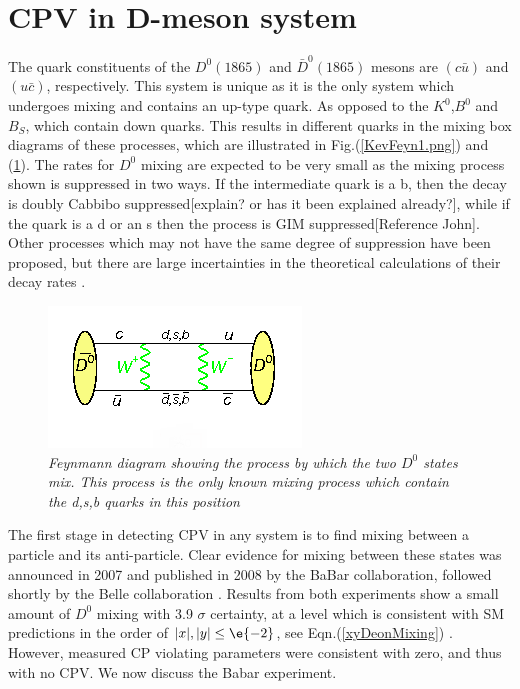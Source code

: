 \section{CPV in D-meson system}

The quark constituents of the $D^{0}(1865)$ and $\bar{D}^{0}(1865)$ mesons are $(c \bar{u})$ and $(u \bar{c})$, respectively. This system is unique as it is the only system which undergoes mixing and contains an up-type quark. As opposed to the $K^{0}$,$B^{0}$ and $B_{S}$, which contain down quarks. This results in different quarks in the mixing box diagrams of these processes, which are illustrated in Fig.(\ref{KevFeyn1.png}) and (\ref{Deon_Mixing_Feyn}). The rates for $D^0$ mixing are expected to be very small as the mixing process shown is suppressed in two ways. If the intermediate quark is a b, then the decay is doubly Cabbibo suppressed[explain? or has it been explained already?], while if the quark is a d or an s then the process is GIM suppressed[Reference John]. Other processes which may not have the same degree of suppression have been proposed, but there are large incertainties in the theoretical calculations of their decay rates \cite{Babar_D0_Review}.    

\begin{figure}[h!]
\begin{center}
\includegraphics[scale=0.8]{figs/Deon_mixing_feyn.png}
\end{center}
\caption{\textit{Feynmann diagram showing the process by which the two $D^{0}$ states mix. This process is the only known mixing process which contain the d,s,b quarks in this position \cite{Deon_Mixing_Feyn}}}
\label{Deon_Mixing_Feyn}
\end{figure}

The first stage in detecting CPV in any system is to find mixing between a particle and its anti-particle. Clear evidence for mixing between these states was announced in 2007 and published in 2008 by the BaBar collaboration, followed shortly by the Belle collaboration \cite{BabarD0mixing}\cite{BelleD0mixing}. Results from both experiments show a small amount of $D^{0}$ mixing with 3.9 $\sigma$ certainty, at a level which is consistent with SM predictions in the order of $|x|,|y| \leq \e{-2}$, see Eqn.(\ref{xyDeonMixing}) \cite{Babar_D0_Review}. However, measured CP violating parameters were consistent with zero, and thus with no CPV. We now discuss the Babar experiment.

